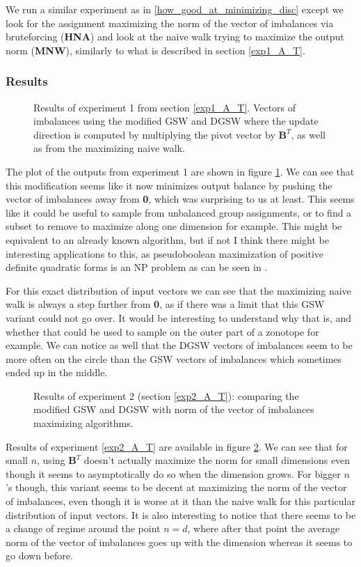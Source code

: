 \documentclass[12pt]{article}
\begin{document}
We run a similar experiment as in \ref{how_good_at_minimizing_disc} except we look for the assignment maximizing the norm of the vector of imbalances via bruteforcing (\textbf{HNA}) and look at the naive walk trying to maximize the output norm (\textbf{MNW}), similarly to what is described in section \ref{exp1_A_T}.

\subsubsection{Results}
\begin{figure}[h!]
\centering

\caption{Results of experiment 1 from section \ref{exp1_A_T}. Vectors of imbalances using the modified GSW and DGSW where the update direction is computed by multiplying the pivot vector by $\textbf{B}^T$, as well as from the maximizing naive walk.}
\label{A_T_instead_of_lstsq}
\end{figure}
The plot of the outputs from experiment 1 are shown in figure \ref{A_T_instead_of_lstsq}. We can see that this modification seems like it now minimizes output balance by pushing the vector of imbalances away from \textbf{0}, which was surprising to us at least. This seems like it could be useful to sample from unbalanced group assignments, or to find a subset to remove to maximize along one dimension for example. This might be equivalent to an already known algorithm, but if not I think there might be interesting applications to this, as pseudoboolean maximization of positive definite quadratic forms is an NP problem as can be seen in \cite{gritzmann19890}. 

For this exact distribution of input vectors we can see that the maximizing naive walk is always a step further from \textbf{0}, as if there was a limit that this GSW variant could not go over. It would be interesting to understand why that is, and whether that could be used to sample on the outer part of a zonotope for example. We can notice as well that the DGSW vectors of imbalances seem to be more often on the circle than the GSW vectors of imbalances which sometimes ended up in the middle.

\begin{figure}[h!]
\centering

\caption{Results of experiment 2 (section \ref{exp2_A_T}): comparing the modified GSW and DGSW with norm of the vector of imbalances maximizing algorithms.}
\label{A_T_instead_of_lstsq_2}
\end{figure}
Results of experiment \ref{exp2_A_T} are available in figure \ref{A_T_instead_of_lstsq_2}. We can see that for small $n$, using $\textbf{B}^T$ doesn't actually maximize the norm for small dimensions even though it seems to asymptotically do so when the dimension grows. For bigger $n$'s though, this variant seems to be decent at maximizing the norm of the vector of imbalances, even though it is worse at it than the naive walk for this particular distribution of input vectors. It is also interesting to notice that there seems to be a change of regime around the point $n=d$, where after that point the average norm of the vector of imbalances goes up with the dimension whereas it seems to go down before.
\end{document}
